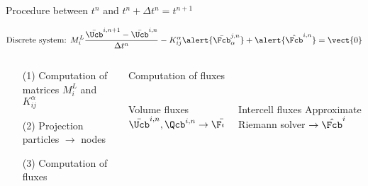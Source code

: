 \begin{frame}{Procedure between $t^n$ and $t^n + \Delta t^n=t^{n+1}$}
\begin{footnotesize}
\begin{overprint}
      \begin{equation*}
        \text{Discrete system: }M^L_{i} \frac{\bar{\Ucb}^{i,n+1} - \bar{\Ucb}^{i,n}}{\Delta t^n}  - K_{ij}^\alpha \alert{\bar{\Fcb}^{j,n}_{\alpha}}  + \alert{\hat{\Fcb}^{i,n}}=  \vect{0}
      \end{equation*}
      \begin{columns}
        \begin{column}{0.4\textwidth}
          \begin{itemize}
          \item[(1)] Computation of matrices $M_i^L$ and $K_{ij}^\alpha$
          \item[(2)] Projection particles $\rightarrow$ nodes
          \item[(3)] Computation of fluxes
          \end{itemize}
        \end{column}
        \vrule{}
        \begin{column}{0.6\textwidth}
          \begin{block}{Computation of fluxes}
            \begin{columns}
              \begin{column}{0.4\textwidth}
                \begin{block}{\footnotesize Volume fluxes}
                  $\bar{\Ucb}^{i,n},\Qcb^{i,n} \rightarrow \bar{\Fcb}^{i,n}_\alpha$
                \end{block}
              \end{column}
              \begin{column}{0.55\textwidth}
                \begin{block}{\footnotesize Intercell fluxes}
                  Approximate Riemann solver $\rightarrow \hat{\Fcb}^i$
                \end{block}
              \end{column}
            \end{columns}
          \end{block}
        \end{column}
      \end{columns}
      

\end{overprint}
\end{footnotesize}
\end{frame}

